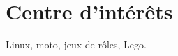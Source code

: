 \documentclass[letterpaper]{twentysecondcv} %
\begin{document}

\section{Centre d'intérêts}

Linux, moto, jeux de rôles, Lego.
\end{document}
